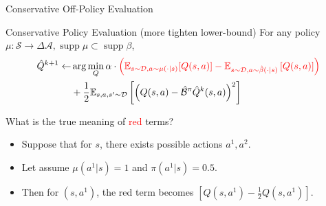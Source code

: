 \documentclass[11pt]{beamer}
\newcommand{\mbb}[1]{\mathbb{#1}}
\newcommand{\mc}[1]{\mathcal{#1}}
\newcommand{\supp}{\operatorname{supp}}
\begin{document}
\begin{frame}{Conservative Off-Policy Evaluation}
    \begin{block}{Conservative Policy Evaluation (more tighten lower-bound)}
    For any policy $\mu : \mc{S} \to \Delta{\mc{A}}, \supp \mu \subset \supp \beta$,
    \[
    \begin{aligned}
          \hat{Q}^{k+1} \leftarrow &\arg \min_{Q} \alpha \cdot \textcolor{red}{\left(\mbb{E}_{s \sim \mc{D}, a \sim \mu(\cdot|s)}[Q(s,a)] - \mbb{E}_{s \sim \mc{D}, a \sim \hat{\beta}(\cdot|s)} \left[Q(s,a)\right] \right)} \\
          &+ \frac{1}{2} \mbb{E}_{s,a,s^\prime \sim \mc{D}} \left[ \left(Q(s,a) - \hat{\mc{B}}^\pi \hat{Q}^{k}(s,a)\right)^2\right]
  \end{aligned}
  \]
  \end{block}

  What is the true meaning of \textcolor{red}{red} terms?
  \begin{itemize}
    \item Suppose that for $s$, there exists possible actions $a^1, a^2$.
    \item Let assume $\mu(a^1|s) = 1$ and $\pi(a^1|s) = 0.5$.
    \item Then for $(s,a^1)$, the red term becomes $\left[ Q(s,a^1) - \frac{1}{2}Q(s,a^1) \right]$.
  \end{itemize}


\end{frame}
\end{document}
